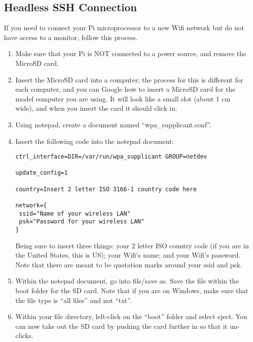 \documentclass{article}\usepackage[]{graphicx}\usepackage[]{color}
\begin{document}
\subsection{Headless SSH Connection}

If you need to connect your Pi microprocessor to a new Wifi network but do not have access to a monitor, follow this process. 

\begin{enumerate}

\item Make sure that your Pi is NOT connected to a power source, and remove the MicroSD card.

\item Insert the MicroSD card into a computer; the process for this is different for each computer, and you can Google how to insert a MicroSD card for the model computer you are using.  It will look like a small slot (about 1 cm wide), and when you insert the card it should click in.

\item Using notepad, create a document named ``wpa\_supplicant.conf''. 

\item Insert the following code into the notepad document:

\begin{lstlisting}
ctrl_interface=DIR=/var/run/wpa_supplicant GROUP=netdev

update_config=1

country=Insert 2 letter ISO 3166-1 country code here

network={
 ssid="Name of your wireless LAN"
 psk="Password for your wireless LAN"
}
\end{lstlisting}

Being sure to insert three things: your 2 letter ISO country code (if you are in the United States, this is US); your Wifi's name; and your Wifi's password.  Note that there are meant to be quotation marks around your ssid and psk.

\item Within the notepad document, go into file/save as.  Save the file within the boot folder for the SD card.  Note that if you are on Windows, make sure that the file type is ``all files'' and not ``txt''.

\item Within your file directory, left-click on the ``boot'' folder and select eject.  You can now take out the SD card by pushing the card further in so that it un-clicks.


\end{enumerate}
\end{document}
